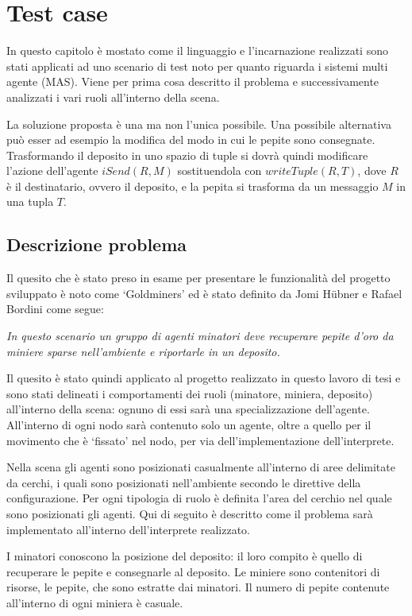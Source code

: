 \chapter{Test case}\label{chap:validation}
In questo capitolo è mostato come il linguaggio e l'incarnazione realizzati sono stati applicati ad uno scenario di test noto per quanto riguarda i sistemi multi agente (MAS).
Viene per prima cosa descritto il problema e successivamente analizzati i vari ruoli all'interno della scena.

La soluzione proposta è una ma non l'unica possibile. Una possibile alternativa può esser ad esempio la modifica del modo in cui le pepite sono consegnate. Trasformando il deposito in uno spazio di tuple si dovrà quindi modificare l'azione dell'agente $iSend(R,M)$ sostituendola con $writeTuple(R,T)$, dove $R$ è il destinatario, ovvero il deposito, e la pepita si trasforma da un messaggio $M$ in una tupla $T$.

\section{Descrizione problema}
Il quesito che è stato preso in esame per presentare le funzionalità del progetto sviluppato è noto come `Goldminers' ed è stato definito da Jomi H\"ubner e Rafael Bordini come segue:
%
\begin{center}
	\textit{In questo scenario un gruppo di agenti minatori deve recuperare pepite d'oro da miniere sparse nell'ambiente e riportarle in un deposito.}
\end{center}

Il quesito è stato quindi applicato al progetto realizzato in questo lavoro di tesi e sono stati delineati i comportamenti dei ruoli (minatore, miniera, deposito) all'interno della scena: ognuno di essi sarà una specializzazione dell'agente. All'interno di ogni nodo sarà contenuto solo un agente, oltre a quello per il movimento che è `fissato' nel nodo, per via dell'implementazione dell'interprete.

Nella scena gli agenti sono posizionati casualmente all'interno di aree delimitate da cerchi, i quali sono posizionati nell'ambiente secondo le direttive della configurazione. Per ogni tipologia di ruolo è definita l'area del cerchio nel quale sono posizionati gli agenti.
%
Qui di seguito è descritto come il problema sarà implementato all'interno dell'interprete realizzato.

I minatori conoscono la posizione del deposito: il loro compito è quello di recuperare le pepite e consegnarle al deposito.
Le miniere sono contenitori di risorse, le pepite, che sono estratte dai minatori. Il numero di pepite contenute all'interno di ogni miniera è casuale.

